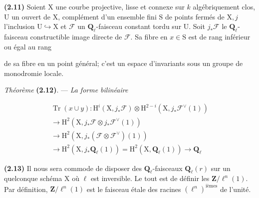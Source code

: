 \documentclass[10pt,leqno]{article}
\begin{document}
\noindent \textbf{(2.11)} Soient \(\mathrm{X}\) une courbe projective, lisse et connexe sur \(k\) algébriquement clos, \(\mathrm{U}\) un ouvert de \(\mathrm{X}\), complément d’un ensemble fini \(\mathrm{S}\) de points fermés de \(\mathrm{X}, j\) l’inclusion \(\mathrm{U}\hookrightarrow \mathrm{X}\) et \(\mathcal{F} \) un \(\mathbf{Q}_{\ell }\)-faisceau constant tordu sur \(\mathrm{U}\). Soit \(j_{*}\mathcal{F} \) le \(\mathbf{Q}_{\ell }\)-faisceau constructible image directe de \(\mathcal{F} \). Sa fibre en \(x\in \mathrm{S}\) est de rang inférieur ou égal au rang\par

\clearpage

\label{physical-12}

\noindent de sa fibre en un point général; c’est un espace d’invariants sous un groupe de monodromie locale.\par

\noindent \emph{Théorème} \textbf{(2.12)}. — {\itshape La forme bilinéaire}\par

\begin{equation*}\begin{gathered}\operatorname{Tr}(x\cup y) : \mathrm{H}^{i}(\mathrm{X},j_{*}\mathcal{F} )\otimes \mathrm{H}^{2- i}(\mathrm{X},j_{*}\mathcal{F} ^{\vee }(1)) \\ \longrightarrow  \mathrm{H}^{2}(\mathrm{X},j_{*}\mathcal{F} \otimes j_{*}\mathcal{F} ^{\vee }(1)) \\ \longrightarrow  \mathrm{H}^{2}(\mathrm{X},j_{*}(\mathcal{F} \otimes \mathcal{F} ^{\vee })(1)) \\ \longrightarrow  \mathrm{H}^{2}(\mathrm{X},j_{*}\mathbf{Q}_{\ell }(1)) = \mathrm{H}^{2}(\mathrm{X},\mathbf{Q}_{\ell }(1)) \longrightarrow  \mathbf{Q}_{\ell }\end{gathered}\end{equation*}

\par

\noindent \textbf{(2.13)} Il nous sera commode de disposer des \(\mathbf{Q}_{\ell }\)-faisceaux \(\mathbf{Q}_{\ell }(r)\) sur un quelconque schéma \(\mathrm{X}\) où \(\ell \) est inversible. Le tout est de définir les \(\mathbf{Z}/\ell ^{n}(1)\). Par définition, \(\mathbf{Z}/\ell ^{n}(1)\) est le faisceau étale des racines \((\ell ^{n})^{\mathrm{ièmes}}\) de l’unité.\par
\end{document}
